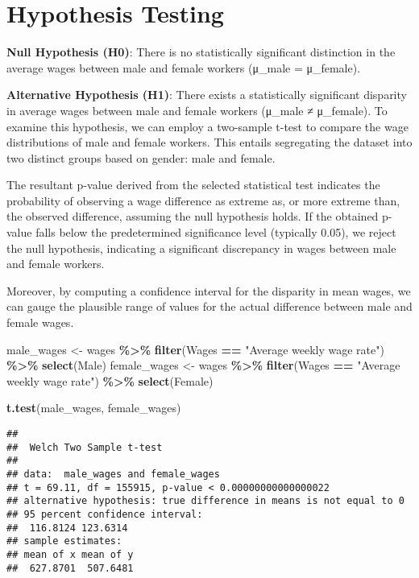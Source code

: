 \documentclass[
]{article}
\newenvironment{Shaded}{\begin{snugshade}}{\end{snugshade}}
\newcommand{\FunctionTok}[1]{\textcolor[rgb]{0.13,0.29,0.53}{\textbf{#1}}}
\newcommand{\NormalTok}[1]{#1}
\newcommand{\OtherTok}[1]{\textcolor[rgb]{0.56,0.35,0.01}{#1}}
\newcommand{\SpecialCharTok}[1]{\textcolor[rgb]{0.81,0.36,0.00}{\textbf{#1}}}
\newcommand{\StringTok}[1]{\textcolor[rgb]{0.31,0.60,0.02}{#1}}
\begin{document}
\section{Hypothesis Testing}\label{hypothesis-testing}

\textbf{Null Hypothesis (H0)}: There is no statistically significant
distinction in the average wages between male and female workers
(μ\_male = μ\_female).

\textbf{Alternative Hypothesis (H1)}: There exists a statistically
significant disparity in average wages between male and female workers
(μ\_male ≠ μ\_female). To examine this hypothesis, we can employ a
two-sample t-test to compare the wage distributions of male and female
workers. This entails segregating the dataset into two distinct groups
based on gender: male and female.

The resultant p-value derived from the selected statistical test
indicates the probability of observing a wage difference as extreme as,
or more extreme than, the observed difference, assuming the null
hypothesis holds. If the obtained p-value falls below the predetermined
significance level (typically 0.05), we reject the null hypothesis,
indicating a significant discrepancy in wages between male and female
workers.

Moreover, by computing a confidence interval for the disparity in mean
wages, we can gauge the plausible range of values for the actual
difference between male and female wages.

\begin{Shaded}
\begin{Highlighting}[]
\NormalTok{male\_wages }\OtherTok{\textless{}{-}}\NormalTok{ wages }\SpecialCharTok{\%\textgreater{}\%} \FunctionTok{filter}\NormalTok{(Wages }\SpecialCharTok{==} \StringTok{"Average weekly wage rate"}\NormalTok{) }\SpecialCharTok{\%\textgreater{}\%} \FunctionTok{select}\NormalTok{(Male)}
\NormalTok{female\_wages }\OtherTok{\textless{}{-}}\NormalTok{ wages }\SpecialCharTok{\%\textgreater{}\%} \FunctionTok{filter}\NormalTok{(Wages }\SpecialCharTok{==} \StringTok{"Average weekly wage rate"}\NormalTok{) }\SpecialCharTok{\%\textgreater{}\%} \FunctionTok{select}\NormalTok{(Female)}

\FunctionTok{t.test}\NormalTok{(male\_wages, female\_wages)}
\end{Highlighting}
\end{Shaded}

\begin{verbatim}
## 
##  Welch Two Sample t-test
## 
## data:  male_wages and female_wages
## t = 69.11, df = 155915, p-value < 0.00000000000000022
## alternative hypothesis: true difference in means is not equal to 0
## 95 percent confidence interval:
##  116.8124 123.6314
## sample estimates:
## mean of x mean of y 
##  627.8701  507.6481
\end{verbatim}
\end{document}
